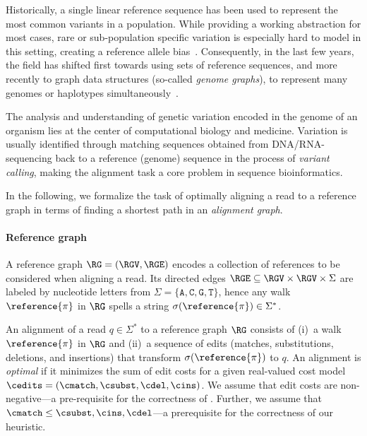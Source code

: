 Historically, a single linear reference sequence has been used to represent the
most common variants in a population. While providing a working abstraction for
most cases, rare or sub-population specific variation is especially hard to
model in this setting, creating a reference allele
bias~\cite{stevenson_sources_2013,brandt_mapping_2015}. Consequently, in the
last few years, the field has shifted first towards using sets of reference
sequences, and more recently to graph data structures (so-called {\em genome
graphs}), to represent many genomes or haplotypes
simultaneously~\cite{dilthey_improved_2015,paten_genome_2017,garrison_variation_2018}.

The analysis and understanding of genetic variation encoded in the genome of an
organism lies at the center of computational biology and medicine. Variation is
usually identified through matching sequences obtained from DNA/RNA-sequencing
back to a reference (genome) sequence in the process of \emph{variant calling},
making the alignment task a core problem in sequence bioinformatics.

%
In the following, we formalize the task of optimally aligning a read to a
reference graph in terms of finding a shortest path in an \emph{alignment
graph}.

\paragraph{Reference graph}
%
A reference graph $\RG=(\RGV,\RGE)$ encodes a collection of references to be
considered when aligning a read. Its directed edges $\RGE \subseteq \RGV \times
\RGV \times \Sigma$ are labeled by nucleotide letters from $\Sigma =
\{\texttt{A},\texttt{C},\texttt{G},\texttt{T}\}$, hence any walk
$\reference{\pi}$ in $\RG$ spells a string $\sigma(\reference{\pi}) \in
\Sigma^*$.

An alignment of a read $q \in \Sigma^*$ to a reference graph $\RG$ consists of
(i)~a walk $\reference{\pi}$ in $\RG$ and (ii)~a sequence of edits (matches,
substitutions, deletions, and insertions) that transform
$\sigma(\reference{\pi})$ to $q$. An alignment is \emph{optimal} if it minimizes
the sum of edit costs for a given real-valued cost model $\cedits = (\cmatch,
\csubst,\cdel, \cins)$.
%
We assume that edit costs are non-negative---a pre-requisite for the correctness
of \A. Further, we assume that $\cmatch \leq \csubst, \cins, \cdel$---a
prerequisite for the correctness of our heuristic.

